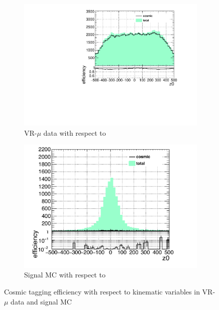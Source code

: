 \begin{figure}[!ht]
  \begin{subfigure}[b]{0.4\textwidth}
  	\includegraphics[width=\textwidth]{figures/cosmics/wider_tag_ratio_z0.pdf}
  	\caption{VR-$\mu$ data with respect to \z}
  \end{subfigure}
  \begin{subfigure}[b]{0.4\textwidth}
  	\includegraphics[width=\textwidth]{figures/cosmics/mc_300_ratio_z0.pdf}
  	\caption{Signal \ac{MC} with respect to \z}
  \end{subfigure}
  \caption{Cosmic tagging efficiency with respect to kinematic variables in VR-$\mu$ data and signal \ac{MC}}
\end{figure}
